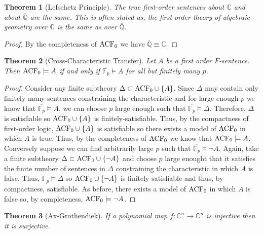 \documentclass[12pt]{article}
\newcommand{\C}{\mathbb{C}}
\newcommand{\Q}{\mathbb{Q}}
\newcommand{\finfield}[1]{\mathbb{F}_{#1}}
\newcommand{\entails}{\models}
\theoremstyle{theorem}
\newtheorem{theorem}{Theorem}[section]
\theoremstyle{definition}
\theoremstyle{definition}
\theoremstyle{remark}
\theoremstyle{definition}
\theoremstyle{remark}
\begin{document}
\begin{theorem}[Lefschetz Principle]
The true first-order sentences about $\C$ and about $\overline{\Q}$ are the same. This is often stated as, the first-order theory of algebraic geometry over $\C$ is the same as over $\overline{\Q}$.
\end{theorem}

\begin{proof}
By the completeness of $\mathrm{ACF}_{0}$ we have $\overline{\Q} \equiv \C$. 
\end{proof}

\begin{theorem}[Cross-Characteristic Transfer]
Let $A$ be a first order $F$-sentence. Then $\ACF{0} \entails A$ if and only if $\overline{\finfield{p}} \entails A$ for all but finitely many $p$.   
\end{theorem}

\begin{proof}
Consider any finite subtheory $\Delta \subset \mathrm{ACF}_{0} \cup \{A\}$. Since $\Delta$ may contain only finitely many sentences constraining the characteristic and for large enough $p$ we know that $\overline{\finfield{p}} \entails A$, we can choose $p$ large enough such that $\overline{\finfield{p}}  \entails \Delta$. Therefore, $\Delta$ is satisfiable so $\mathrm{ACF}_{0} \cup \{A\}$ is finitely-satisfiable. Thus, by the compactness of first-order logic, $\mathrm{ACF}_{0} \cup \{A\}$ is satisfiable so there exists a model of $\mathrm{ACF}_{0}$ in which $A$ is true. Thus, by the completeness of $\mathrm{ACF}_{0}$ we know that $\ACF{0} \entails A$.   
\bigskip\\
Conversely suppose we can find arbitrarily large $p$ such that $\overline{\finfield{p}} \entails \neg A$. Again, take a finite subtheory $\Delta \subset \mathrm{ACF}_{0} \cup \{\neg A\}$ and choose $p$ large enought that it satisfies the finite number of sentences in $\Delta$ constraining the characteristic in which $A$ is false. Thus, $\overline{\finfield{p}} \entails \Delta$ so $\mathrm{ACF}_{0} \cup \{\neg A\}$ is finitely satisfiable and thus, by compactness, satisfiable. As before, there exists a model of $\mathrm{ACF}_{0}$ in which $A$ is false so, by completeness, $\ACF{0} \entails \neg A$. 
\end{proof}

\begin{theorem}[Ax-Grothendiek]
If a polynomial map $f : \C^n \to \C^n$ is injective then it is surjective.
\end{theorem}
\end{document}
